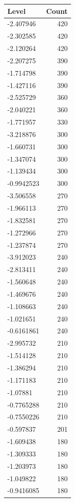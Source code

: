\begin{table}[ht]
\centering
\begin{tabular}{lr}
  \hline
Level & Count \\ 
  \hline
-2.407946 & 420 \\ 
  -2.302585 & 420 \\ 
  -2.120264 & 420 \\ 
  -2.207275 & 390 \\ 
  -1.714798 & 390 \\ 
  -1.427116 & 390 \\ 
  -2.525729 & 360 \\ 
  -2.040221 & 360 \\ 
  -1.771957 & 330 \\ 
  -3.218876 & 300 \\ 
  -1.660731 & 300 \\ 
  -1.347074 & 300 \\ 
  -1.139434 & 300 \\ 
  -0.9942523 & 300 \\ 
  -3.506558 & 270 \\ 
  -1.966113 & 270 \\ 
  -1.832581 & 270 \\ 
  -1.272966 & 270 \\ 
  -1.237874 & 270 \\ 
  -3.912023 & 240 \\ 
  -2.813411 & 240 \\ 
  -1.560648 & 240 \\ 
  -1.469676 & 240 \\ 
  -1.108663 & 240 \\ 
  -1.021651 & 240 \\ 
  -0.6161861 & 240 \\ 
  -2.995732 & 210 \\ 
  -1.514128 & 210 \\ 
  -1.386294 & 210 \\ 
  -1.171183 & 210 \\ 
  -1.07881 & 210 \\ 
  -0.7765288 & 210 \\ 
  -0.7550226 & 210 \\ 
  -0.597837 & 201 \\ 
  -1.609438 & 180 \\ 
  -1.309333 & 180 \\ 
  -1.203973 & 180 \\ 
  -1.049822 & 180 \\ 
  -0.9416085 & 180 \\ 

\end{tabular}
\end{table}

